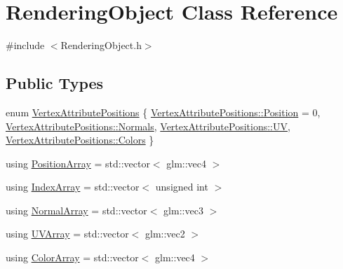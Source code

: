\hypertarget{class_rendering_object}{}\section{Rendering\+Object Class Reference}
\label{class_rendering_object}


{\ttfamily \#include $<$Rendering\+Object.\+h$>$}

\subsection*{Public Types}
\begin{DoxyCompactItemize}
\item 
enum \hyperlink{class_rendering_object_ab772f569ef63a1db07db29a744b519ee}{Vertex\+Attribute\+Positions} \{ \hyperlink{class_rendering_object_ab772f569ef63a1db07db29a744b519eea52f5e0bc3859bc5f5e25130b6c7e8881}{Vertex\+Attribute\+Positions\+::\+Position} = 0, 
\hyperlink{class_rendering_object_ab772f569ef63a1db07db29a744b519eea4ab971a51f0335cbf8d9c2c65d379e99}{Vertex\+Attribute\+Positions\+::\+Normals}, 
\hyperlink{class_rendering_object_ab772f569ef63a1db07db29a744b519eeadeaa2adbeb26802ae61609c3f3642d82}{Vertex\+Attribute\+Positions\+::\+U\+V}, 
\hyperlink{class_rendering_object_ab772f569ef63a1db07db29a744b519eea5d50889672f6f860d14f502de3de1957}{Vertex\+Attribute\+Positions\+::\+Colors}
 \}
\item 
using \hyperlink{class_rendering_object_a1223b9cf03f2029b9c43d71042c2a18e}{Position\+Array} = std\+::vector$<$ glm\+::vec4 $>$
\item 
using \hyperlink{class_rendering_object_a9931c88bca3384065c6691dfe1e60af1}{Index\+Array} = std\+::vector$<$ unsigned int $>$
\item 
using \hyperlink{class_rendering_object_a327c4d892de8d6138fb59afa6d078257}{Normal\+Array} = std\+::vector$<$ glm\+::vec3 $>$
\item 
using \hyperlink{class_rendering_object_a504ecd45ebe36dfa5b78c46d64d9904a}{U\+V\+Array} = std\+::vector$<$ glm\+::vec2 $>$
\item 
using \hyperlink{class_rendering_object_a8a12e1f9be788d99af6c089e1c600022}{Color\+Array} = std\+::vector$<$ glm\+::vec4 $>$
\end{DoxyCompactItemize}
